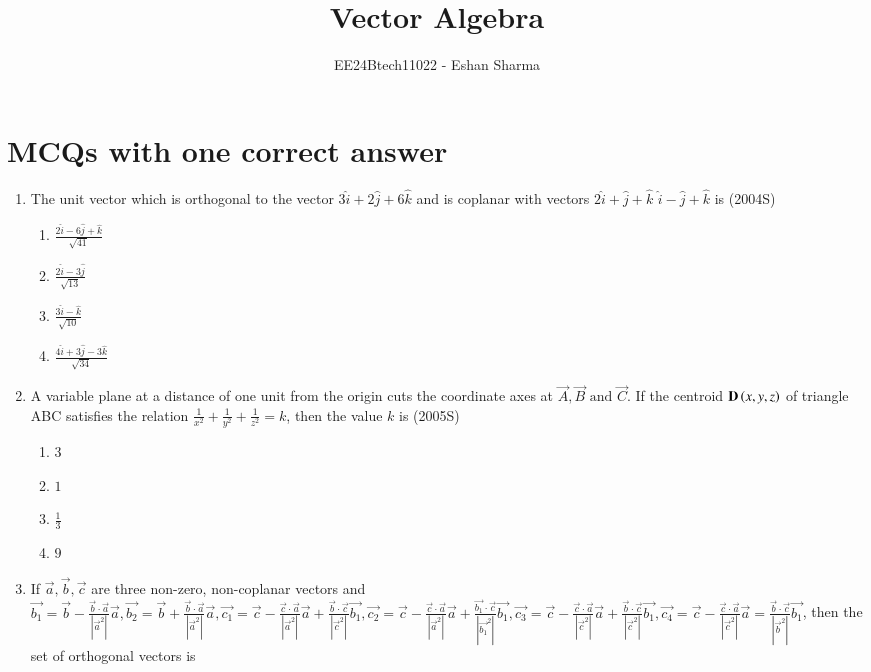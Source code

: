 \documentclass[journal,12pt,onecolumn]{IEEEtran}
\theoremstyle{remark}
\begin{document}

\vspace{3cm}

\title{Vector Algebra}
\author{EE24Btech11022 - Eshan Sharma}
\maketitle

\renewcommand{\thefigure}{\theenumi}
\renewcommand{\thetable}{\theenumi}


\section{MCQs with one correct answer}
\begin{enumerate}
    \item The unit vector which is orthogonal to the vector $3\hat{i} + 2\hat{j} + 6\hat{k}$ and is coplanar with vectors $2\hat{i} + \hat{j} + \hat{k}$  $\hat{i} - \hat{j} + \hat{k}$ is 
    \hfill{(2004S)}
    \begin{multicols}{2}
    \begin{enumerate}
    \item $\frac{2\hat{i} - 6\hat{j} + \hat{k}}{\sqrt{41}}$
    \item $\frac{2\hat{i} - 3\hat{j}}{\sqrt{13}}$
    \item $\frac{3\hat{i} - \hat{k}}{\sqrt{10}}$
    \item $\frac{4\hat{i} + 3\hat{j} - 3\hat{k}}{\sqrt{34}}$
    \end{enumerate}
    \end{multicols}
    \item A variable plane at a distance of one unit from the origin cuts the coordinate axes at $\vec{A}, \vec{B} \text{ and } \vec{C}$. If the centroid $\mathbf{D} \left(x,y,z\right)$ of triangle ABC satisfies the relation $\frac{1}{x^{2}} + \frac{1}{y^{2}} + \frac{1}{z^{2}} = k$, then the value $k$ is
    \hfill{(2005S)}
    \begin{multicols}{2}
    \begin{enumerate}
    \item $3$
    \item $1$
    \item $\frac{1}{3}$
    \item $9$
    \end{enumerate}
    \end{multicols}
    \item If $\vec{a}, \vec{b}, \vec{c}$ are three non-zero, non-coplanar vectors and $\vec{b_1} = \vec{b} - \frac{\vec{b} \cdot \vec{a}}{|\vec{a}^2|} \vec{a}, \vec{b_2} = \vec{b} + \frac{\vec{b} \cdot \vec{a}}{|\vec{a}^2|} \vec{a}, \vec{c_1} = \vec{c} - \frac{\vec{c} \cdot \vec{a}}{|\vec{a}^2|} \vec{a} + \frac{\vec{b} \cdot \vec{c}}{|\vec{c}^2|} \vec{b_1}, \vec{c_2} = \vec{c} - \frac{\vec{c} \cdot \vec{a}}{|\vec{a}^2|} \vec{a} + \frac{\vec{b_1} \cdot \vec{c}}{|\vec{b_1}^2|} \vec{b_1}, \vec{c_3} = \vec{c} - \frac{\vec{c} \cdot \vec{a}}{|\vec{c}^2|} \vec{a} + \frac{\vec{b} \cdot \vec{c}}{|\vec{c}^2|} \vec{b_1}, \vec{c_4} = \vec{c} - \frac{\vec{c} \cdot \vec{a}}{|\vec{c}^2|} \vec{a} = \frac{\vec{b} \cdot \vec{c}}{|\vec{b}^2|} \vec{b_1}$, then the set of orthogonal vectors is 

\end{enumerate}
\end{document}
